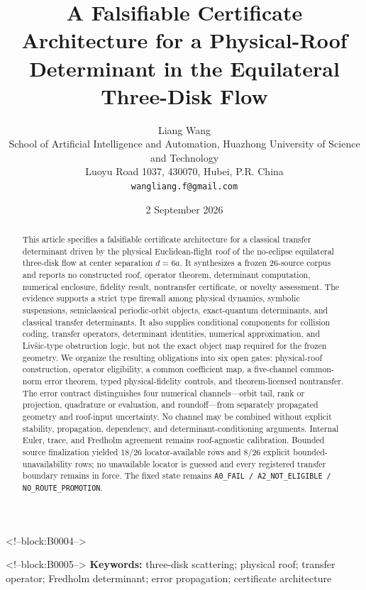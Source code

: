 \documentclass[11pt,a4paper]{article}
\title{A Falsifiable Certificate Architecture for a Physical-Roof Determinant in the Equilateral Three-Disk Flow}
\author{Liang Wang\\
\small School of Artificial Intelligence and Automation, Huazhong University of Science and Technology\\
\small Luoyu Road 1037, 430070, Hubei, P.R. China\\
\small \texttt{wangliang.f@gmail.com}}
\date{2 September 2026}
\begin{document}
\maketitle

<!--block:B0004-->
\begin{abstract}
This article specifies a falsifiable certificate architecture for a classical transfer determinant driven by the physical Euclidean-flight roof of the no-eclipse equilateral three-disk flow at center separation \(d=6a\). It synthesizes a frozen 26-source corpus and reports no constructed roof, operator theorem, determinant computation, numerical enclosure, fidelity result, nontransfer certificate, or novelty assessment. The evidence supports a strict type firewall among physical dynamics, symbolic suspensions, semiclassical periodic-orbit objects, exact-quantum determinants, and classical transfer determinants. It also supplies conditional components for collision coding, transfer operators, determinant identities, numerical approximation, and Liv\v{s}ic-type obstruction logic, but not the exact object map required for the frozen geometry. We organize the resulting obligations into six open gates: physical-roof construction, operator eligibility, a common coefficient map, a five-channel common-norm error theorem, typed physical-fidelity controls, and theorem-licensed nontransfer. The error contract distinguishes four numerical channels---orbit tail, rank or projection, quadrature or evaluation, and roundoff---from separately propagated geometry and roof-input uncertainty. No channel may be combined without explicit stability, propagation, dependency, and determinant-conditioning arguments. Internal Euler, trace, and Fredholm agreement remains roof-agnostic calibration. Bounded source finalization yielded 18/26 locator-available rows and 8/26 explicit bounded-unavailability rows; no unavailable locator is guessed and every registered transfer boundary remains in force. The fixed state remains \texttt{A0\_FAIL / A2\_NOT\_ELIGIBLE / NO\_ROUTE\_PROMOTION}.
\end{abstract}

<!--block:B0005-->
\noindent\textbf{Keywords:} three-disk scattering; physical roof; transfer operator; Fredholm determinant; error propagation; certificate architecture
\end{document}
